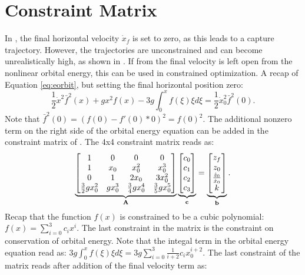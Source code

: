 \section{Constraint Matrix}
In \cite{koolen2016balance}, the final horizontal velocity $\dot{x}_f$ is set to zero, as this leads to a capture trajectory. However, the trajectories are unconstrained and can become unrealistically high, as shown in . If from the final velocity is left open from the nonlinear orbital energy, this can be used in constrained optimization. A recap of Equation \ref{eq:eorbit}, but setting the final horizontal position zero:
\begin{equation}
    \frac{1}{2}\dot{x}^2\bar{f}^2(x)+gx^2f(x) - 3g\int_{0}^xf(\xi)\xi d\xi = \frac{1}{2}\dot{x}_0^2\bar{f}^2(0).
\end{equation}
Note that $\bar{f}^2(0)=(f(0)-f'(0)*0)^2=f(0)^2$. The additional nonzero term on the right side of the orbital energy equation can be added in the constraint matrix of \cite{koolen2016balance}. The 4x4 constraint matrix reads as:
\begin{equation}
    \underbrace{\begin{bmatrix}1 & 0 & 0 & 0 \\ 
     1 & x_0 & x_0^2 & x_0^3\\
     0 & 1 & 2x_0 & 3x_0^2\\
     \frac{3}{2}gx_0^2 & gx_0^3 & \frac{3}{4}gx_0^4 & \frac{3}{5}gx_0^5\\
     \end{bmatrix}}_{\mathbf{A}}
     \underbrace{\begin{bmatrix}
     c_0\\
     c_1\\
     c_2\\
     c_3\\
     \end{bmatrix}}_{\mathbf{c}}=
     \underbrace{\begin{bmatrix}
     z_f\\
     z_0\\
     \frac{\dot{z}_0}{\dot{x}_0}\\
     k\\
     \end{bmatrix}}_{\mathbf{b}}.
\end{equation}
Recap that the function $f(x)$ is constrained to be a cubic polynomial: $f(x)=\sum_{i=0}^3 c_ix^i$. The last constraint in the matrix is the constraint on conservation of orbital energy. Note that the integal term in the orbital energy equation read as: $3g\int_{0}^xf(\xi)\xi d\xi = 3g\sum_{i=0}^3\frac{1}{i+2}c_ix_0^{i+2}$. The last constraint of the matrix reads after addition of the final velocity term as:
